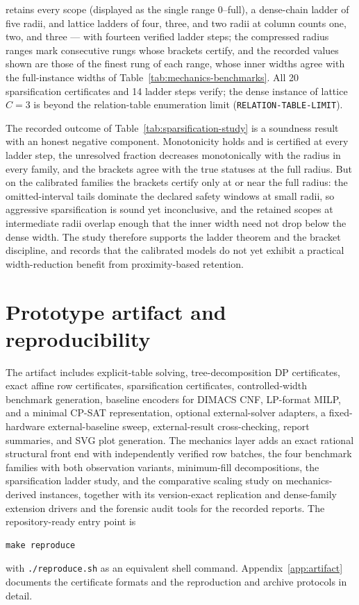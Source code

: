 \documentclass[11pt]{article}
\theoremstyle{plain}
\theoremstyle{definition}
\theoremstyle{remark}
\begin{document}
\begin{center}
{retains every scope (displayed as the single range \(0\)--full), a dense-chain ladder of five radii, and lattice
ladders of four, three, and two radii at column counts one, two, and three
--- with fourteen
verified ladder steps; the compressed radius ranges mark consecutive rungs
whose brackets certify, and the recorded values shown are those of the
finest rung of each range, whose inner widths agree with the full-instance
widths of Table~\ref{tab:mechanics-benchmarks}.  All 20
sparsification certificates and 14 ladder steps verify; the dense instance
of lattice \(C{=}3\) is beyond the relation-table enumeration limit
(\texttt{RELATION-TABLE-LIMIT}).}
\label{tab:sparsification-study}
\end{center}

The recorded outcome of Table~\ref{tab:sparsification-study} is a soundness result with an honest negative
component.  Monotonicity holds and is certified at every ladder step, the
unresolved fraction decreases monotonically with the radius in every family,
and the brackets agree with the true statuses at the full radius.  But on
the calibrated families the brackets certify only at or near the full
radius: the omitted-interval tails dominate the declared safety windows at
small radii, so aggressive sparsification is sound yet inconclusive, and the
retained scopes at intermediate radii overlap enough that the inner width
need not drop below the dense width.  The study therefore supports the
ladder theorem and the bracket discipline, and records that the calibrated
models do not yet exhibit a practical width-reduction benefit from
proximity-based retention.

\section{Prototype artifact and reproducibility}
\label{sec:artifact}

The artifact includes explicit-table solving, tree-decomposition DP
certificates, exact affine row certificates, sparsification certificates,
controlled-width benchmark generation, baseline encoders for DIMACS CNF,
LP-format MILP, and a minimal CP-SAT representation, optional
external-solver adapters, a fixed-hardware external-baseline sweep,
external-result cross-checking, report summaries, and SVG plot generation.
The mechanics layer adds an exact rational structural front end with
independently verified row batches, the four benchmark families with both
observation variants, minimum-fill decompositions, the sparsification ladder
study, and the comparative scaling study on mechanics-derived instances,
together with its version-exact replication and dense-family extension
drivers and the forensic audit tools for the recorded reports.
The repository-ready entry point is
\begin{verbatim}
make reproduce
\end{verbatim}
with \texttt{./reproduce.sh} as an equivalent shell command.
Appendix~\ref{app:artifact} documents the certificate formats and the
reproduction and archive protocols in detail.
\end{document}
